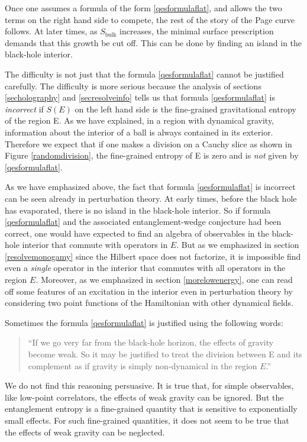 \documentclass[12pt]{article}
\begin{document}
Once one assumes a formula of the form \eqref{qesformulaflat}, and allows the two terms on the right hand side to compete, the rest of the story of the Page curve follows. At later times, as $S_{\text{bulk}}$ increases, the minimal surface prescription demands that this growth be cut off.  This can be done by finding an island in the black-hole interior.

The difficulty is not just that the formula \eqref{qesformulaflat} cannot be justified carefully. The difficulty is more serious because the analysis of sections \ref{secholography} and \ref{secresolveinfo} tells us that formula \eqref{qesformulaflat} is {\em incorrect} if $S(E)$ on the left hand side is the fine-grained gravitational entropy of the region E. As we have explained, in a region with dynamical gravity, information about the interior of a ball is always contained in its exterior. Therefore we expect that if one makes a division on a Cauchy slice as shown in Figure \ref{randomdivision}, the fine-grained entropy of E is zero and is {\em not} given by \eqref{qesformulaflat}.

As we have emphasized above, the fact that formula \eqref{qesformulaflat} is incorrect can be seen already in perturbation theory. At early times, before the black hole has evaporated, there is no island in the black-hole interior. So if formula \eqref{qesformulaflat} and the associated entanglement-wedge conjecture had been correct, one would have expected to find an algebra of observables in the black-hole interior that commute with operators in $E$. But as we emphasized  in section \ref{resolvemonogamy} since the Hilbert space does not factorize, it is impossible  find even a {\em single} operator in the interior that commutes with all operators in the region $E$. Moreover, as we emphasized in section \ref{morelowenergy}, one can read off some features of an excitation in the interior even in perturbation theory by considering two point functions of the Hamiltonian with other dynamical fields.

Sometimes the formula \eqref{qesformulaflat} is justified using the following words:
\begin{quote}
``If we go very far from the black-hole horizon, the effects of  gravity become weak. So it may be justified to treat the division between E and
its complement as if gravity is simply non-dynamical in the region $E$.''
\end{quote}
We do not find this reasoning persuasive. It is true that, for simple observables, like low-point correlators, the effects of weak gravity can be ignored.  But
the entanglement entropy is a fine-grained quantity that is sensitive to exponentially small effects. For such fine-grained quantities, it does not seem to be true that the effects of weak gravity can be neglected.
\end{document}

